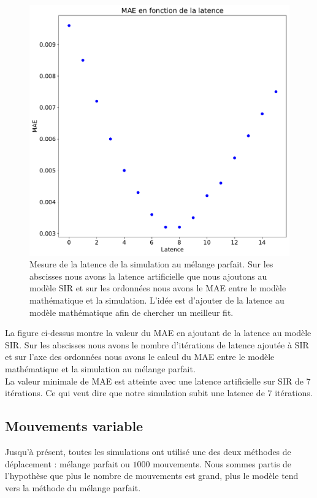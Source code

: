 \newpage

\begin{figure}[h]
    \centering
	\captionsetup{justification=centering}
	\includegraphics[width=.7\textwidth]{Images/SIR_latence_8_5.pdf}
	\caption[Mesures de latences SIR]{Mesure de la latence de la simulation au mélange parfait. Sur les abscisses nous avons la latence artificielle que nous ajoutons au modèle SIR et sur les ordonnées nous avons le MAE entre le modèle mathématique et la simulation. L'idée est d'ajouter de la latence au modèle mathématique afin de chercher un meilleur fit.}
\end{figure}

La figure ci-dessus montre la valeur du MAE en ajoutant de la latence au modèle SIR. Sur les abscisses nous avons le nombre d'itérations de latence ajoutée à SIR et sur l'axe des ordonnées nous avons le calcul du MAE entre le modèle mathématique et la simulation au mélange parfait.\\

La valeur minimale de MAE est atteinte avec une latence artificielle sur SIR de $7$ itérations. Ce qui veut dire que notre simulation subit une latence de $7$ itérations.

\newpage

\subsection{Mouvements variable}

Jusqu'à présent, toutes les simulations ont utilisé une des deux méthodes de déplacement : mélange parfait ou $1000$ mouvements. Nous sommes partis de l'hypothèse que plus le nombre de mouvements est grand, plus le modèle tend vers la méthode du mélange parfait.\\

